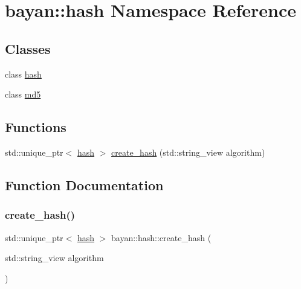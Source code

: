 \hypertarget{namespacebayan_1_1hash}{}\section{bayan\+:\+:hash Namespace Reference}
\label{namespacebayan_1_1hash}
\subsection*{Classes}
\begin{DoxyCompactItemize}
\item 
class \hyperlink{classbayan_1_1hash_1_1hash}{hash}
\item 
class \hyperlink{classbayan_1_1hash_1_1md5}{md5}
\end{DoxyCompactItemize}
\subsection*{Functions}
\begin{DoxyCompactItemize}
\item 
std\+::unique\+\_\+ptr$<$ \hyperlink{classbayan_1_1hash_1_1hash}{hash} $>$ \hyperlink{namespacebayan_1_1hash_a9cd51387d3f16f6a1e7c76c47ee00a3b}{create\+\_\+hash} (std\+::string\+\_\+view algorithm)
\end{DoxyCompactItemize}


\subsection{Function Documentation}
\mbox{\label{namespacebayan_1_1hash_a9cd51387d3f16f6a1e7c76c47ee00a3b}} 
\subsubsection{\texorpdfstring{create\+\_\+hash()}{create\_hash()}}
{\footnotesize\ttfamily std\+::unique\+\_\+ptr$<$ \hyperlink{classbayan_1_1hash_1_1hash}{hash} $>$ bayan\+::hash\+::create\+\_\+hash (\begin{DoxyParamCaption}\item[{std\+::string\+\_\+view}]{algorithm }\end{DoxyParamCaption})}

